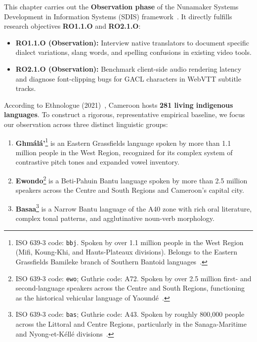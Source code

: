 \documentclass[a4paper,11pt]{article}
\begin{document}
This chapter carries out the \textbf{Observation phase} of the Nunamaker Systems Development in Information Systems (SDIS) framework~\cite{nunamaker1990systems}. It directly fulfills research objectives \textbf{RO1.1.O} and \textbf{RO2.1.O}:
\begin{itemize}
    \item \textbf{RO1.1.O (Observation):} Interview native translators to document specific dialect variations, slang words, and spelling confusions in existing video tools.
    \item \textbf{RO2.1.O (Observation):} Benchmark client-side audio rendering latency and diagnose font-clipping bugs for GACL characters in WebVTT subtitle tracks.
\end{itemize}

According to Ethnologue (2021)~\cite{eberhard2021ethnologue}, Cameroon hosts \textbf{281 living indigenous languages}. To construct a rigorous, representative empirical baseline, we focus our observation across three distinct linguistic groups:
\begin{enumerate}
    \item \textbf{Gh\textopeno m\'al\'a'}\footnote{ISO 639-3 code: \texttt{bbj}. Spoken by over 1.1 million people in the West Region (Mifi, Koung-Khi, and Hauts-Plateaux divisions). Belongs to the Eastern Grassfields Bamileke branch of Southern Bantoid languages~\cite{watters2003grassfields, sadembouo1984systematique}.} is an Eastern Grassfields language spoken by more than 1.1 million people in the West Region, recognized for its complex system of contrastive pitch tones and expanded vowel inventory.
    \item \textbf{Ewondo}\footnote{ISO 639-3 code: \texttt{ewo}; Guthrie code: A72. Spoken by over 2.5 million first- and second-language speakers across the Centre and South Regions, functioning as the historical vehicular language of Yaound\'e~\cite{essono2000ewondo, bitjaakody2001basaa}.} is a Beti-Pahuin Bantu language spoken by more than 2.5 million speakers across the Centre and South Regions and Cameroon's capital city.
    \item \textbf{Basaa}\footnote{ISO 639-3 code: \texttt{bas}; Guthrie code: A43. Spoken by roughly 800,000 people across the Littoral and Centre Regions, particularly in the Sanaga-Maritime and Nyong-et-K\'ell\'e divisions~\cite{lemb1973dictionnaire, bitjaakody2001basaa}.} is a Narrow Bantu language of the A40 zone with rich oral literature, complex tonal patterns, and agglutinative noun-verb morphology.
\end{enumerate}
\end{document}

